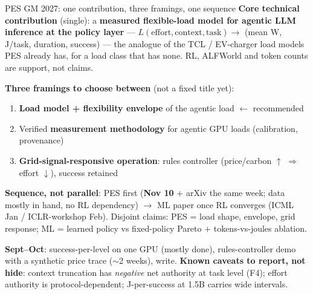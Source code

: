 \documentclass[10pt,aspectratio=169]{beamer}
\begin{document}
\begin{frame}{PES GM 2027: one contribution, three framings, one sequence}
\footnotesize
\textbf{Core technical contribution} (single): a \textbf{measured flexible-load model for agentic
LLM inference at the policy layer} --- $L(\text{effort}, \text{context}, \text{task}) \rightarrow$
(mean W, J/task, duration, success) --- the analogue of the TCL / EV-charger load models PES
already has, for a load class that has none. RL, ALFWorld and token counts are support, not claims.
\vspace{0.35em}

\textbf{Three framings to choose between} (not a fixed title yet):
\begin{enumerate}\itemsep 0.15em
  \item \textbf{Load model + flexibility envelope} of the agentic load \hfill $\leftarrow$ recommended
  \item Verified \textbf{measurement methodology} for agentic GPU loads (calibration, provenance)
  \item \textbf{Grid-signal-responsive operation}: rules controller (price/carbon $\uparrow$ $\Rightarrow$
        effort $\downarrow$), success retained
\end{enumerate}
\vspace{0.35em}

\textbf{Sequence, not parallel}: PES first (\textbf{Nov 10} + arXiv the same week; data mostly in
hand, no RL dependency) $\rightarrow$ ML paper once RL converges (ICML Jan / ICLR-workshop Feb).
Disjoint claims: PES = load shape, envelope, grid response; ML = learned policy vs fixed-policy
Pareto + tokens-vs-joules ablation.
\vspace{0.35em}

\textbf{Sept--Oct}: success-per-level on one GPU (mostly done), rules-controller demo with a
synthetic price trace ($\sim$2 weeks), write. \textbf{Known caveats to report, not hide}: context
truncation has \emph{negative} net authority at task level (F4); effort authority is
protocol-dependent; J-per-success at 1.5B carries wide intervals.
\end{frame}
\end{document}
